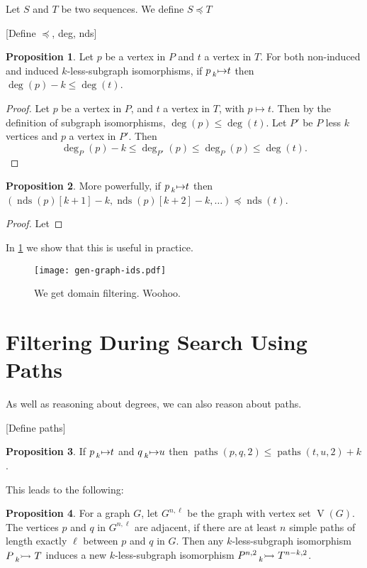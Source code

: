 \documentclass[letterpaper]{article}
\theoremstyle{definition}
\newtheorem{proposition}{Proposition}
\newcommand{\nds}{\operatorname{nds}}
\newcommand{\lessnonind}[1]{\prescript{}{#1}{\rightarrowtail}\ }
\newcommand{\todo}[1]{{\color{red} {[}{#1}{]}}}
\begin{document}
Let $S$ and $T$ be two sequences. We define $S \preceq T$

\todo{Define $\preceq$, deg, nds}

\begin{proposition}
    Let $p$ be a vertex in $P$ and $t$ a vertex in $T$. For both non-induced and induced
    $k$-less-subgraph isomorphisms, if $p \prescript{}{k}{\mapsto} t$ then
    $\deg(p) - k \le \deg(t)$.
\end{proposition}
\begin{proof}
Let $p$ be a vertex in $P$, and $t$ a vertex in $T$, with $p\mapsto t$. Then by the definition of subgraph isomorphisms, $\deg(p) \le \deg(t)$. Let $P'$ be $P$ less $k$ vertices and $p$ a vertex in $P'$. Then
\[
\deg_{P}(p)-k \le \deg_{P'}(p) \le \deg_{P}(p) \le \deg(t).
\]
\end{proof}

\begin{proposition}
    More powerfully, if $p \prescript{}{k}{\mapsto} t$ then
    $(\nds(p)[k+1] - k, \nds(p)[k+2] - k, \ldots) \preceq \nds(t)$.
\end{proposition}

\begin{proof}
Let

\end{proof}

In \cref{figure:ids} we show that this is useful in practice.

\begin{figure}
    \texttt{[image: gen-graph-ids.pdf]}
    \caption{We get domain filtering. Woohoo.}\label{figure:ids}
\end{figure}

\section{Filtering During Search Using Paths}

As well as reasoning about degrees, we can also reason about paths.

\todo{Define paths}

\begin{proposition}
    If $p \prescript{}{k}{\mapsto} t$ and $q \prescript{}{k}{\mapsto} u$ then
     $\operatorname{paths}(p, q, 2) \le \operatorname{paths}(t, u, 2) + k$.
\end{proposition}

This leads to the following:

\begin{proposition}
    For a graph $G$, let $G^{n, \ell}$ be the graph with vertex set $\operatorname{V}(G)$. The
    vertices $p$ and $q$ in $G^{n, \ell}$ are adjacent, if there are at least $n$ simple paths of
    length exactly $\ell$ between $p$ and $q$ in $G$. Then any $k$-less-subgraph isomorphism
    $P \lessnonind{k} T$ induces a new $k$-less-subgraph isomorphism
    $P^{n, 2}\lessnonind{k} T^{n - k, 2}$.
\end{proposition}
\end{document}
